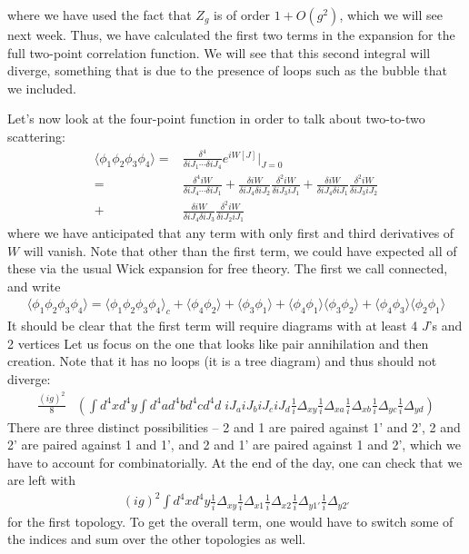 \documentclass{../mathnotes}
\begin{document}
where we have used the fact that $Z_g$ is of order $1+O(g^2)$, which we will see next week. Thus, we have calculated the first two terms in the 
expansion for the full two-point correlation function. We will see that this second integral will diverge, something that is due to the presence
of loops such as the bubble that we included.

Let's now look at the four-point function in order to talk about two-to-two scattering:
\begin{align*}
    \langle \phi_1 \phi_2 \phi_3 \phi_4\rangle=&\frac{\delta^4}{\delta iJ_1 \cdots \delta iJ_4}e^{iW[J]}\bigg|_{J=0}\\
    =&\frac{\delta^4 iW}{\delta iJ_4\cdots\delta iJ_1}+\frac{\delta iW}{\delta iJ_4\delta iJ_2}\frac{\delta^2iW}{\delta iJ_3iJ_1}+
    \frac{\delta iW}{\delta iJ_4\delta iJ_1}\frac{\delta^2iW}{\delta iJ_3iJ_2}\\
    +& \frac{\delta iW}{\delta iJ_4\delta iJ_3}\frac{\delta^2iW}{\delta iJ_2iJ_1}
\end{align*}
where we have anticipated that any term with only first and third derivatives of $W$ will vanish. Note that other than the first term,
we could have expected all of these via the usual Wick expansion for free theory. The first we call connected, and write
\begin{align*}
    \langle \phi_1 \phi_2 \phi_3 \phi_4\rangle=\langle \phi_1\phi_2\phi_3\phi_4\rangle_c+\langle\phi_4\phi_2\rangle+\langle\phi_3\phi_1\rangle
    +\langle \phi_4\phi_1\rangle\langle \phi_3\phi_2\rangle+\langle\phi_4\phi_3\rangle\langle\phi_2\phi_1\rangle
\end{align*}
It should be clear that the first term will require diagrams with at least 4 $J$'s and 2 vertices
Let us focus on the one that looks like pair annihilation and then creation.
Note that it has no loops (it is a tree diagram) and thus should not diverge:
\begin{align*}
    \frac{(ig)^2}{8}&\left(\int d^4xd^4y\int d^4ad^4bd^4cd^4d\;iJ_aiJ_biJ_ciJ_d\frac{1}{i}\Delta_{xy}\frac{1}{i}\Delta_{xa}\frac{1}{i}\Delta_{xb}\frac{1}{i}\Delta_{yc}\frac{1}{i}\Delta_{yd}\right)
\end{align*}
There are three distinct possibilities -- 2 and 1 are paired against 1' and 2', 2 and 2' are paired against 1 and 1', and 2 and 1' are paired against 1 and 2', which
we have to account for combinatorially. At the end of the day, one can check that we are left with
\begin{align*}
    (ig)^2\int d^4xd^4y\frac{1}{i}\Delta_{xy}\frac{1}{i}\Delta_{x1}\frac{1}{i}\Delta_{x2}\frac{1}{i}\Delta_{y1'}\frac{1}{i}\Delta_{y2'}
\end{align*}
for the first topology. To get the overall term, one would have to switch some of the indices and sum over the other topologies as well.
\end{document}
